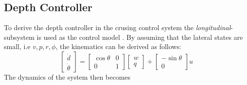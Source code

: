 	\subsection{Depth Controller}
		To derive the depth controller in the crusing control system the
		\textit{longitudinal}-subsystem is used as the control model \cite{fossen}. By assuming that the lateral
		states are small, i.e $v, p, r, \phi$, the kinematics can be derived as follows:
		\begin{equation}
			\left [ \begin{matrix}
					\dot{d} \\
					\dot{\theta}
				\end{matrix} \right] = \left [ \begin{matrix}
								\cos{\theta} & 0 \\
								0 & 1
								\end{matrix} \right] 
						\left[ \begin{matrix}
								w \\
								q
							\end{matrix} \right]
						+ \left [ \begin{matrix}
								-\sin{\theta}\\
								0
							\end{matrix} \right] u
		\end{equation}
		The dynamics of the system then becomes

